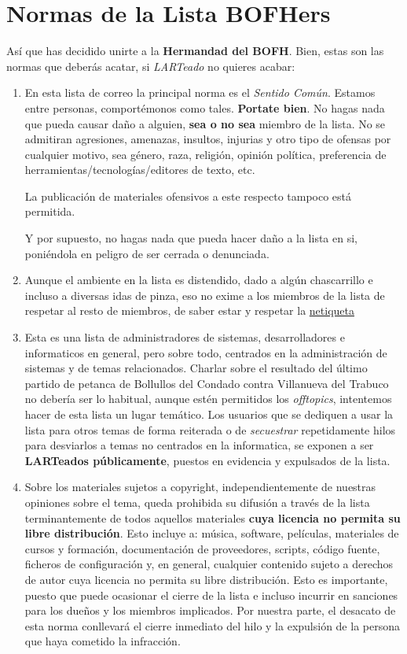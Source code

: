 \section{Normas de la Lista BOFHers}\label{normas-de-la-lista-bofhers}

Así que has decidido unirte a la \textbf{Hermandad del BOFH}. Bien,
estas son las normas que deberás acatar, si \emph{LARTeado} no quieres
acabar:

\begin{enumerate}
\def\labelenumi{\arabic{enumi}.}
\item
  En esta lista de correo la principal norma es el \emph{Sentido Común}.
  Estamos entre personas, comportémonos como tales. \textbf{Portate
  bien}. No hagas nada que pueda causar daño a alguien, \textbf{sea o no
  sea} miembro de la lista. No se admitiran agresiones, amenazas,
  insultos, injurias y otro tipo de ofensas por cualquier motivo, sea
  género, raza, religión, opinión política, preferencia de
  herramientas/tecnologías/editores de texto, etc.

  La publicación de materiales ofensivos a este respecto tampoco está
  permitida.

  Y por supuesto, no hagas nada que pueda hacer daño a la lista en si,
  poniéndola en peligro de ser cerrada o denunciada.
\item
  Aunque el ambiente en la lista es distendido, dado a algún
  chascarrillo e incluso a diversas idas de pinza, eso no exime a los
  miembros de la lista de respetar al resto de miembros, de saber estar
  y respetar la
  \href{https://es.wikipedia.org/wiki/Netiqueta\#Aparici.C3.B3n_de_las_reglas}{netiqueta}
\item
  Esta es una lista de administradores de sistemas, desarrolladores e
  informaticos en general, pero sobre todo, centrados en la
  administración de sistemas y de temas relacionados. Charlar sobre el
  resultado del último partido de petanca de Bollullos del Condado
  contra Villanueva del Trabuco no debería ser lo habitual, aunque estén
  permitidos los \emph{offtopics}, intentemos hacer de esta lista un
  lugar temático. Los usuarios que se dediquen a usar la lista para
  otros temas de forma reiterada o de \emph{secuestrar} repetidamente
  hilos para desviarlos a temas no centrados en la informatica, se
  exponen a ser \textbf{LARTeados públicamente}, puestos en evidencia y
  expulsados de la lista.
\item
  Sobre los materiales sujetos a copyright, independientemente de
  nuestras opiniones sobre el tema, queda prohibida su difusión a través
  de la lista terminantemente de todos aquellos materiales \textbf{cuya
  licencia no permita su libre distribución}. Esto incluye a: música,
  software, películas, materiales de cursos y formación, documentación
  de proveedores, scripts, código fuente, ficheros de configuración y,
  en general, cualquier contenido sujeto a derechos de autor cuya
  licencia no permita su libre distribución. Esto es importante, puesto
  que puede ocasionar el cierre de la lista e incluso incurrir en
  sanciones para los dueños y los miembros implicados. Por nuestra
  parte, el desacato de esta norma conllevará el cierre inmediato del
  hilo y la expulsión de la persona que haya cometido la infracción.


\end{enumerate}
